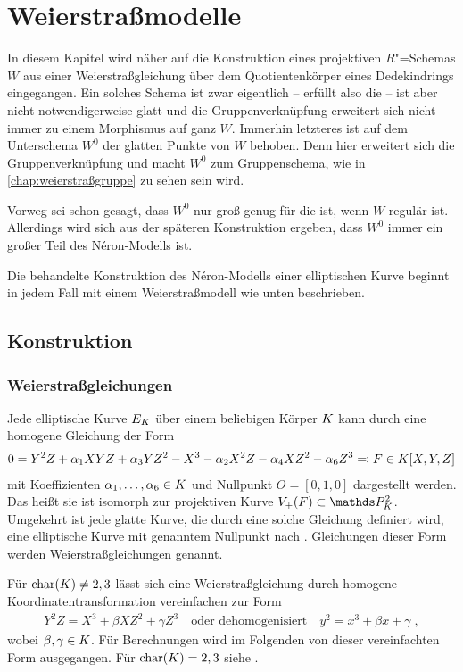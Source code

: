 \chapter{Weierstraßmodelle}\label{chap:weierstraßmodelle}
In diesem Kapitel wird näher auf die Konstruktion eines
projektiven $R$"=Schemas $W$ aus einer Weierstraßgleichung über dem
Quotientenkörper eines Dedekindrings eingegangen.
Ein solches Schema ist zwar eigentlich – erfüllt also die \NAbbEig – ist
aber nicht notwendigerweise glatt und die Gruppenverknüpfung
erweitert sich nicht immer zu einem Morphismus auf ganz $W$.
Immerhin letzteres ist auf dem Unterschema $W^0$ der glatten Punkte
von $W$ behoben. Denn hier erweitert sich die Gruppenverknüpfung und
macht $W^0$ zum Gruppenschema, wie in \autoref{chap:weierstraßgruppe}
zu sehen sein wird.

Vorweg sei schon gesagt, dass $W^0$ nur groß genug für die
\NAbbEig ist, wenn $W$ regulär ist. Allerdings wird sich aus
der späteren Konstruktion ergeben, dass $W^0$ immer ein großer Teil
des Néron-Modells ist.

Die behandelte Konstruktion des Néron-Modells einer elliptischen Kurve
beginnt in jedem Fall mit einem Weierstraßmodell wie unten beschrieben.

\section{Konstruktion}
\subsection{Weierstraßgleichungen}
Jede elliptische Kurve $E_{K}$ über einem beliebigen Körper $K$ kann
durch eine homogene Gleichung der Form
\begin{gather*}
  0 = Y^2 Z + \alpha_1 XYZ + \alpha_3 YZ^2 - X^3 - \alpha_2X^2 Z - \alpha_4 XZ^2 - \alpha_6 Z^3
  \eqqcolon F\in K[X,Y,Z]
\end{gather*}
mit Koeffizienten $\alpha_1,\dotsc,\alpha_6\in K$ und Nullpunkt $O=[0,1,0]$
dargestellt werden. Das heißt sie ist isomorph zur projektiven Kurve
$V_+(F)\subset\P_\K^2$.
Umgekehrt ist jede glatte Kurve, die durch eine
solche Gleichung definiert wird, eine elliptische Kurve mit genanntem
Nullpunkt nach \cite[Proposition~III.3.1]{silverman}.
Gleichungen dieser Form werden Weierstraßgleichungen genannt.

Für $\operatorname{char}(K)\neq 2,3$ lässt sich eine Weierstraßgleichung durch
homogene Koordinatentransformation vereinfachen zur Form
\begin{gather*}
  Y^2 Z = X^3 + \beta XZ^2 + \gamma Z^3
  \quad\text{oder dehomogenisiert}\quad
  y^2 = x^3 + \beta x + \gamma\;,
\end{gather*}
wobei $\beta,\gamma\in K$.
Für Berechnungen wird im Folgenden von dieser vereinfachten Form
ausgegangen. Für $\operatorname{char}(K)=2,3$ siehe
\cite[Appendix: Elliptic Curves in Cha\-rac\-te\-ris\-tics~2 and 3]{silverman}.


